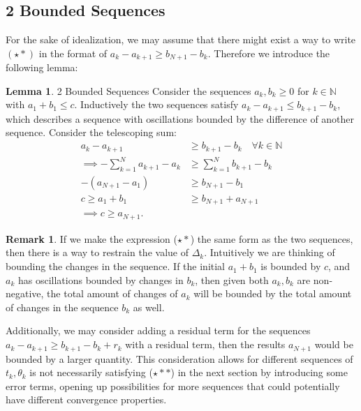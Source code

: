 \documentclass[]{article}
\theoremstyle{definition}
\newtheorem{lemma}{Lemma}[subsection]  %
\newtheorem{remark}{Remark}[subsection]
{
    \newtheorem{assumption}{Assumption}
}
\begin{document}
    \subsection{2 Bounded Sequences}
        For the sake of idealization, we may assume that there might exist a way to write $(\star*)$ in the format of $a_k- a_{k + 1}\ge b_{N+ 1} - b_k$. Therefore we introduce the following lemma: 
        \begin{lemma}{2 Bounded Sequences}
            Consider the sequences $a_k, b_k \ge 0$ for $k\in \mathbb N$ with $a_1 + b_1 \le c$. Inductively the two sequences satisfy $a_{k} - a_{k + 1} \le b_{k + 1} - b_k$, which describes a sequence with oscillations bounded by the difference of another sequence. Consider the telescoping sum: 
            \begin{align*}
                a_{k} - a_{k + 1} 
                &\ge b_{k + 1} - b_k \quad \forall k \in \mathbb N
                \\
                \implies
                -\sum_{k = 1}^{N}
                a_{k + 1} - a_k 
                &\ge 
                \sum_{k = 1}^{N} b_{k + 1} - b_k
                \\
                - (a_{N + 1} - a_1) 
                &\ge b_{N + 1} - b_1
                \\
                c\ge a_1 + b_1
                &\ge
                b_{N + 1} + a_{N +1}
                \\
                \implies c \ge a_{N+1}. 
            \end{align*}
        \end{lemma}
        \begin{remark}
            If we make the expression ($\star*$) the same form as the two sequences, then there is a way to restrain the value of $\Delta_k$. Intuitively we are thinking of bounding the changes in the sequence. If the initial $a_1 + b_1$ is bounded by $c$, and $a_k$ has oscillations bounded by changes in $b_k$, then given both $a_k, b_k$ are non-negative, the total amount of changes of $a_k$ will be bounded by the total amount of changes in the sequence $b_k$ as well. 
            \par
            Additionally, we may consider adding a residual term for the sequences $a_{k} - a_{k + 1} \ge b_{k + 1} - b_k + r_k$ with a residual term, then the results $a_{N + 1}$ would be bounded by a larger quantity. This consideration allows for different sequences of $t_k, \theta_k$ is not necessarily satisfying ($\star**$) in the next section by introducing some error terms, opening up possibilities for more sequences that could potentially have different convergence properties. 
        \end{remark}
\end{document}
